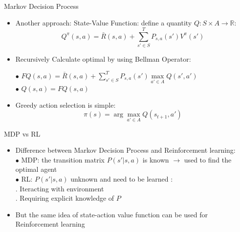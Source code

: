 \begin{frame}{Markov Decision Process}
    \begin{itemize}
        \item Another approach: State-Value Function: define a quantity $Q: S \times A\rightarrow \mathbb{R}$:\\
        \begin{equation}
        Q^\pi(s,a)=\bar{R}(s,a)+\sum_{s' \in S}^{T} P_{s,a} (s')V^\pi(s')
        \end{equation}
        \item  Recursively Calculate optimal by using Bellman Operator:
        \bigskip
        
        \hspace{0.5cm}$\bullet$ $ FQ(s,a)=\bar{R}(s,a)+\sum_{s' \in S}^{T} P_{s,a} (s') \max\limits_{a'\in A} Q (s',a') $\\
        \hspace{0.5cm}$\bullet$  $Q(s,a)=FQ(s,a)$
        \bigskip
        
        \item Greedy action selection is simple:
        \begin{equation}
        \pi(s)=\arg\max\limits_{a' \in A}Q(s_{t+1},a')
        \end{equation}
    \end{itemize}
\end{frame}


\begin{frame}{MDP vs RL}
    \begin{itemize}
        \item Difference between Markov Decision Process and Reinforcement learning:\\
        \bigskip
        \hspace{0.5cm}$\bullet$  MDP: the transition matrix $P(s'|s,a)$ is known $\rightarrow$ used to find the optimal agent\\
        \hspace{0.5cm}$\bullet$  RL: $P(s'|s,a)$ unknown and need to be learned :\\
        \hspace{1cm} . Iteracting with environment \\
        \hspace{1cm} . Requiring explicit knowledge of $P$
        \bigskip
        \item But the same idea of state-action value function can be used for Reinforcement learning
        
    \end{itemize}
\end{frame}

